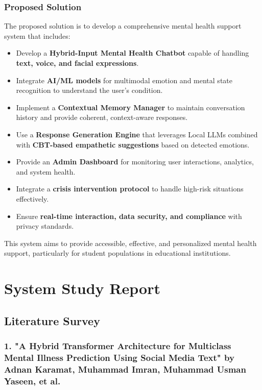 \documentclass[11pt]{report}
\begin{document}
\subsection{Proposed Solution}
The proposed solution is to develop a comprehensive mental health support system that includes:
\begin{itemize}
    \item Develop a \textbf{Hybrid-Input Mental Health Chatbot} capable of handling \textbf{text, voice, and facial expressions}.
    \item Integrate \textbf{AI/ML models} for multimodal emotion and mental state recognition to understand the user's condition.
    \item Implement a \textbf{Contextual Memory Manager} to maintain conversation history and provide coherent, context-aware responses.
    \item Use a \textbf{Response Generation Engine} that leverages Local LLMs combined with \textbf{CBT-based empathetic suggestions} based on detected emotions.
    \item Provide an \textbf{Admin Dashboard} for monitoring user interactions, analytics, and system health.
    \item Integrate a \textbf{crisis intervention protocol} to handle high-risk situations effectively.
    \item Ensure \textbf{real-time interaction, data security, and compliance} with privacy standards.
\end{itemize}

This system aims to provide accessible, effective, and personalized mental health support, particularly for student populations in educational institutions.

\chapter{System Study Report}
\section{Literature Survey}

\subsection{1. "A Hybrid Transformer Architecture for Multiclass Mental Illness Prediction Using Social Media Text" by Adnan Karamat, Muhammad Imran, Muhammad Usman Yaseen, et al. \cite{1}}
\end{document}
